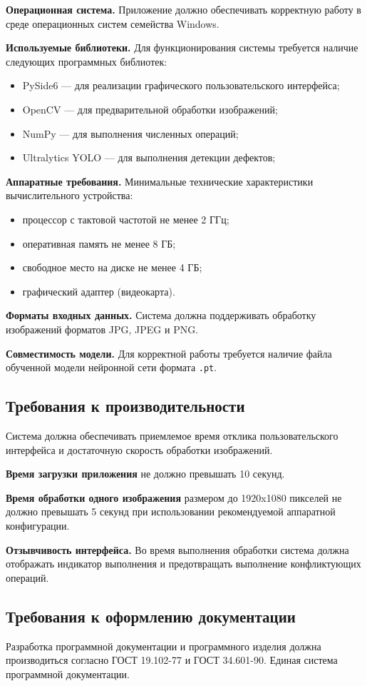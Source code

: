 \textbf{Операционная система.} Приложение должно обеспечивать корректную работу в среде операционных систем семейства Windows.

\textbf{Используемые библиотеки.} Для функционирования системы требуется наличие следующих программных библиотек:

\begin{itemize}
	\item PySide6 --- для реализации графического пользовательского интерфейса;
	\item OpenCV --- для предварительной обработки изображений;
	\item NumPy --- для выполнения численных операций;
	\item Ultralytics YOLO --- для выполнения детекции дефектов;
\end{itemize}

\textbf{Аппаратные требования.} Минимальные технические характеристики вычислительного устройства:

\begin{itemize}
	\item процессор с тактовой частотой не менее 2 ГГц;
	\item оперативная память не менее 8 ГБ;
	\item свободное место на диске не менее 4 ГБ;
	\item графический адаптер (видеокарта).
\end{itemize}

\textbf{Форматы входных данных.} Система должна поддерживать обработку изображений форматов JPG, JPEG и PNG.

\textbf{Совместимость модели.} Для корректной работы требуется наличие файла обученной модели нейронной сети формата \texttt{.pt}.

\subsection{Требования к производительности}

Система должна обеспечивать приемлемое время отклика пользовательского интерфейса и достаточную скорость обработки изображений.

\textbf{Время загрузки приложения} не должно превышать 10 секунд.

\textbf{Время обработки одного изображения} размером до 1920x1080 пикселей не должно превышать 5 секунд при использовании рекомендуемой аппаратной конфигурации.

\textbf{Отзывчивость интерфейса.} Во время выполнения обработки система должна отображать индикатор выполнения и предотвращать выполнение конфликтующих операций.

\subsection{Требования к оформлению документации}

Разработка программной документации и программного изделия должна производиться согласно ГОСТ 19.102-77 и ГОСТ 34.601-90. Единая система программной документации.
